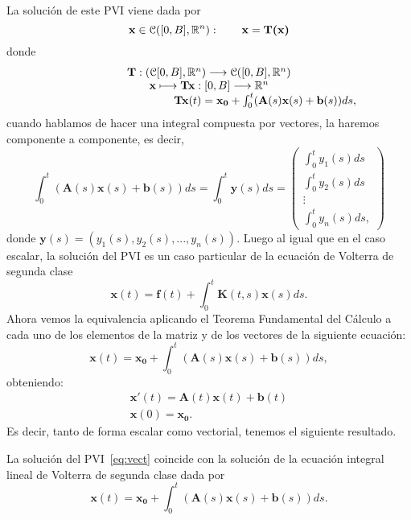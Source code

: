 La solución de este PVI viene dada por
\begin{equation}
	\textbf{x} \in \mathcal{C}([0,B],\mathbb{R}^n): \qquad \textbf{x} = \textbf{T(x)}
\end{equation}
donde 
\begin{equation}
	\begin{array}{c}
		\textbf{T}: (\mathcal{C}[0,B], \mathbb{R}^n) \longrightarrow \mathcal{C}([0,B],\mathbb{R}^n) \\  \textbf{x} \longmapsto \textbf{Tx}:[0,B] \longrightarrow \mathbb{R}^n \\  \qquad \qquad \qquad \qquad \qquad \textbf{Tx}(t)= \textbf{x}_\textbf{0} + \int_0^t (\textbf{A}(s)\textbf{x}(s)+\textbf{b}(s))ds,
	\end{array}
\end{equation}
cuando hablamos de hacer una integral compuesta por vectores, la haremos componente a componente, es decir,
\begin{equation}
	\int_0^t (\textbf{A}(s)\textbf{x}(s)+\textbf{b}(s))ds = \int_0^t \textbf{y}(s)ds = \begin{pmatrix}
	\displaystyle	\int_0^t y_1(s)ds \\ \displaystyle \int_0^t y_2(s)ds \\ \vdots \\ \displaystyle \int_0^t y_n(s)ds,
	\end{pmatrix}
\end{equation}
donde $\textbf{y}(s) = (y_1(s),y_2(s),...,y_n(s))$. Luego al igual que en el caso escalar, la solución del PVI es un caso particular de la ecuación de Volterra de segunda clase
\begin{equation}
	\textbf{x}(t) = \textbf{f}(t) + \int_0^t \textbf{K}(t,s)\textbf{x}(s)ds.
\end{equation}
Ahora vemos la equivalencia aplicando el Teorema Fundamental del Cálculo a cada uno de los elementos de la matriz y de los vectores de la siguiente ecuación:
\begin{equation}
	\textbf{x}(t)= \textbf{x}_\textbf{0} + \int_0^t (\textbf{A}(s)\textbf{x}(s)+\textbf{b}(s))ds,
\end{equation}
obteniendo:
\begin{equation}
	\begin{array}{c}
		\textbf{x}'(t) = \textbf{A}(t)\textbf{x}(t)+\textbf{b}(t) \\ \textbf{x}(0) = \textbf{x}_\textbf{0}.
	\end{array}
\end{equation}
Es decir, tanto de forma escalar como vectorial, tenemos el siguiente resultado.
\begin{corolario}
	La solución del PVI~\eqref{eq:vect} coincide con la solución de la ecuación integral lineal de Volterra de segunda clase dada por
	\begin{equation}
		\textbf{x}(t)= \textbf{x}_\textbf{0} + \int_0^t (\textbf{A}(s)\textbf{x}(s)+\textbf{b}(s))ds.
	\end{equation}
\end{corolario}

